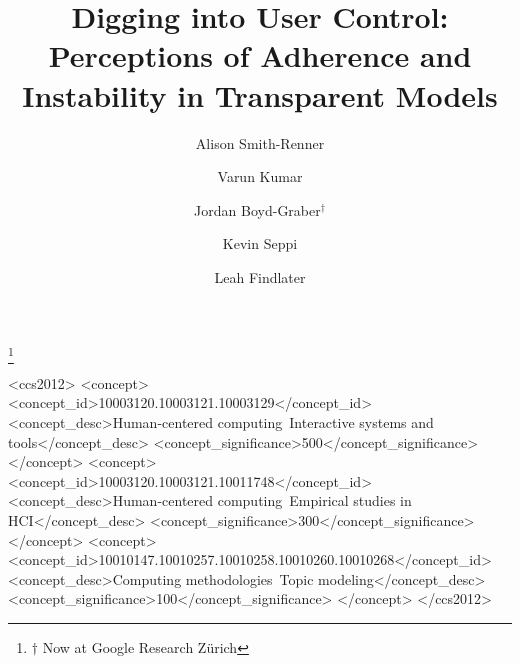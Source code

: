 \documentclass[sigconf]{acmart}
\newcommand{\latexfile}[1]{}
\begin{document}
\title{Digging into User Control: Perceptions of Adherence and Instability in Transparent Models}

\author{Alison Smith-Renner}

\author{Varun Kumar}

\author{Jordan Boyd-Graber$^\dagger$}
\thanks{$\dagger$ Now at Google Research Z\"urich}

\author{Kevin Seppi}

\author{Leah Findlater}

\renewcommand{\shortauthors}{Smith-Renner et al.}

\begin{abstract}
\latexfile{00-abstract}
\end{abstract}


\begin{CCSXML}
<ccs2012>
   <concept>
       <concept_id>10003120.10003121.10003129</concept_id>
       <concept_desc>Human-centered computing~Interactive systems and tools</concept_desc>
       <concept_significance>500</concept_significance>
       </concept>
   <concept>
       <concept_id>10003120.10003121.10011748</concept_id>
       <concept_desc>Human-centered computing~Empirical studies in HCI</concept_desc>
       <concept_significance>300</concept_significance>
       </concept>
   <concept>
       <concept_id>10010147.10010257.10010258.10010260.10010268</concept_id>
       <concept_desc>Computing methodologies~Topic modeling</concept_desc>
       <concept_significance>100</concept_significance>
       </concept>
 </ccs2012>
\end{CCSXML}



\end{document}
